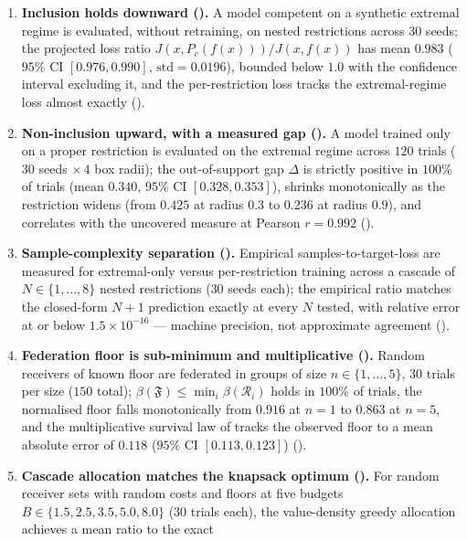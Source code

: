 \documentclass[11pt,twocolumn,a4paper]{article}
\theoremstyle{rdm}
\theoremstyle{definition}
\theoremstyle{remark}
\newcommand{\flo}{\beta}
\newcommand{\Rec}{\mathcal{R}}
\newcommand{\Fed}{\mathfrak{F}}
\begin{document}
\begin{enumerate}[leftmargin=*,itemsep=2pt]
\item \textbf{Inclusion holds downward ().} A model
competent on a synthetic extremal regime is evaluated, without retraining,
on nested restrictions across $30$ seeds; the projected loss ratio
$J(x,P_c(f(x)))/J(x,f(x))$ has mean $0.983$ ($95\%$ CI $[0.976,0.990]$,
$\text{std}=0.0196$), bounded below $1.0$ with the confidence interval
excluding it, and the per-restriction loss tracks the extremal-regime loss
almost exactly ().
\item \textbf{Non-inclusion upward, with a measured gap
().} A model trained only on a proper
restriction is evaluated on the extremal regime across $120$ trials ($30$
seeds $\times\,4$ box radii); the out-of-support gap $\Delta$ is strictly
positive in $100\%$ of trials (mean $0.340$, $95\%$ CI $[0.328,0.353]$),
shrinks monotonically as the restriction widens (from $0.425$ at radius
$0.3$ to $0.236$ at radius $0.9$), and correlates with the uncovered measure
at Pearson $r=0.992$ ().
\item \textbf{Sample-complexity separation ().}
Empirical samples-to-target-loss are measured for extremal-only versus
per-restriction training across a cascade of $N\in\{1,\dots,8\}$ nested
restrictions ($30$ seeds each); the empirical ratio matches the closed-form
$N+1$ prediction exactly at every $N$ tested, with relative error at or
below $1.5\times10^{-16}$ --- machine precision, not approximate agreement
().
\item \textbf{Federation floor is sub-minimum and multiplicative
().} Random receivers of known floor are
federated in groups of size $n\in\{1,\dots,5\}$, $30$ trials per size
($150$ total); $\flo(\Fed)\le\min_i\flo(\Rec_i)$ holds in $100\%$ of trials,
the normalised floor falls monotonically from $0.916$ at $n=1$ to $0.863$
at $n=5$, and the multiplicative survival law of  tracks
the observed floor to a mean absolute error of $0.118$ ($95\%$ CI
$[0.113,0.123]$) ().
\item \textbf{Cascade allocation matches the knapsack optimum
().} For random receiver sets with random costs and
floors at five budgets $B\in\{1.5,2.5,3.5,5.0,8.0\}$ ($30$ trials each), the
value-density greedy allocation achieves a mean ratio to the exact

\end{enumerate}
\end{document}

